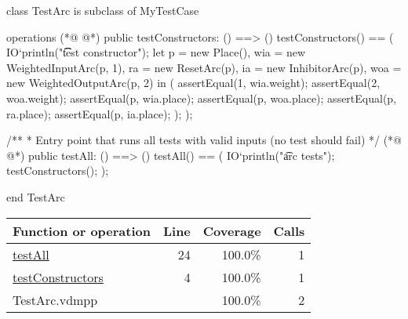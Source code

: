 \begin{vdmpp}
class TestArc is subclass of MyTestCase

operations
(*@
\label{testConstructors:4}
@*)
  public testConstructors: () ==> ()
  testConstructors() == (
    IO`println("\t\t test constructor");
    let p = new Place(),
     wia = new WeightedInputArc(p, 1),
     ra = new ResetArc(p),
     ia = new InhibitorArc(p),
     woa = new WeightedOutputArc(p, 2) in (
      assertEqual(1, wia.weight);
      assertEqual(2, woa.weight);
      assertEqual(p, wia.place);
      assertEqual(p, woa.place);
      assertEqual(p, ra.place);
      assertEqual(p, ia.place);
    );
  );

  /**
   * Entry point that runs all tests with valid inputs (no test should fail)
   */
(*@
\label{testAll:24}
@*)
  public testAll: () ==> ()
  testAll() == (
    IO`println("\t arc tests");
    testConstructors();
  );

end TestArc
\end{vdmpp}
\bigskip
\begin{longtable}{|l|r|r|r|}
\hline
Function or operation & Line & Coverage & Calls \\
\hline
\hline
\hyperref[testAll:24]{testAll} & 24&100.0\% & 1 \\
\hline
\hyperref[testConstructors:4]{testConstructors} & 4&100.0\% & 1 \\
\hline
\hline
TestArc.vdmpp & & 100.0\% & 2 \\
\hline
\end{longtable}